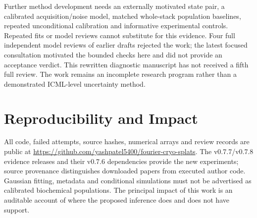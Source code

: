 \documentclass{article}
\begin{document}
Further method development needs an externally motivated state pair,
a calibrated acquisition/noise model, matched whole-stack population
baselines, repeated unconditional calibration and informative experimental
controls. Repeated fits or model reviews cannot substitute for this evidence.
Four full independent model reviews of earlier drafts rejected the work;
the latest focused consultation motivated the bounded checks here and did
not provide an acceptance verdict. This rewritten diagnostic manuscript has
not received a fifth full review. The work remains an incomplete research
program rather than a demonstrated ICML-level uncertainty method.

\section*{Reproducibility and Impact}
All code, failed attempts, source hashes, numerical arrays and review records
are public at \url{https://github.com/yashpatel5400/fourier-cryo-splats}.
The v0.7.7/v0.7.8 evidence releases and their v0.7.6 dependencies provide the
new experiments; source provenance distinguishes downloaded papers from
executed author code. Gaussian fitting, metadata and conditional simulations
must not be advertised as calibrated biochemical populations. The principal
impact of this work is an auditable account of where the proposed inference
does and does not have support.



\clearpage
\appendix

\end{document}

